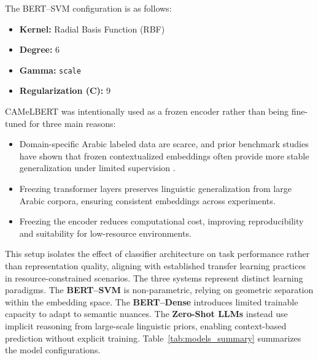 \documentclass[sn-mathphys-num]{sn-jnl}
\begin{document}
\noindent The BERT–SVM configuration is as follows:
\begin{itemize}
    \item \textbf{Kernel:} Radial Basis Function (RBF)
    \item \textbf{Degree:} 6
    \item \textbf{Gamma:} \texttt{scale}
    \item \textbf{Regularization (C):} 9
\end{itemize}

\sloppy
\noindent
CAMeLBERT was intentionally used as a frozen encoder rather than being fine-tuned for three main reasons:
\begin{itemize}
    \item Domain-specific Arabic labeled data are scarce, and prior benchmark studies have shown that frozen contextualized embeddings often provide more stable generalization under limited supervision \cite{AlAyyoub2017, antoun2020,elnagar2023benchmark}.
    \item Freezing transformer layers preserves linguistic generalization from large Arabic corpora, ensuring consistent embeddings across experiments.
    \item Freezing the encoder reduces computational cost, improving reproducibility and suitability for low-resource environments.
\end{itemize}

\sloppy
\noindent
This setup isolates the effect of classifier architecture on task performance rather than representation quality, aligning with established transfer learning practices in resource-constrained scenarios. The three systems represent distinct learning paradigms. The \textbf{BERT–SVM} is non-parametric, relying on geometric separation within the embedding space. The \textbf{BERT–Dense} introduces limited trainable capacity to adapt to semantic nuances. The \textbf{Zero-Shot LLMs} instead use implicit reasoning from large-scale linguistic priors, enabling context-based prediction without explicit training. Table~\ref{tab:models_summary} summarizes the model configurations.
\end{document}

